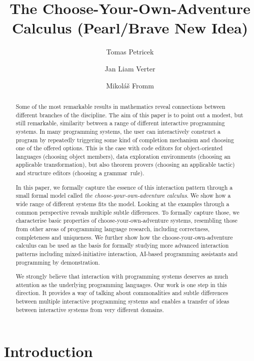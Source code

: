 \documentclass[ a4paper,UKenglish,cleveref, autoref, thm-restate]{lipics-v2021}
\title{The Choose-Your-Own-Adventure Calculus (Pearl/Brave New Idea)}
\author{Tomas Petricek}{Charles University, Prague, Czechia}{tomas@tomasp.net}{0000-0002-7242-2208}{}
\author{Jan Liam Verter}{Charles University, Prague, Czechia}{todo@todo}{}{}
\author{Mikoláš Fromm}{Charles University, Prague, Czechia}{todo@todo}{}{}
\begin{document}
\maketitle

\begin{abstract}
\noindent
Some of the most remarkable results in mathematics reveal connections between different
branches of the discipline. The aim of this paper is to point out a modest, but still
remarkable, similarity between a range of different interactive programming systems.
%
In many programming systems, the user can interactively construct a program by repeatedly
triggering some kind of completion mechanism and choosing one of the offered options. This
is the case with code editors for object-oriented languages (choosing object members), data
exploration environments (choosing an applicable transformation), but also theorem provers
(choosing an applicable tactic) and structure editors (choosing a grammar~rule).

In this paper, we formally capture the essence of this interaction pattern through a small
formal model called \emph{the choose-your-own-adventure calculus}. We show how a wide range
of different systems fits the model. Looking at the examples through a common perspective
reveals multiple subtle differences. To formally capture those, we characterise
basic properties of choose-your-own-adventure systems, resembling those from other areas
of programming language research, including correctness, completeness and uniqueness.
%
We further show how the choose-your-own-adventure calculus can be used as the basis for
formally studying more advanced interaction patterns including mixed-initiative interaction,
AI-based programming assistants and programming by demonstration.

We strongly believe that interaction with programming systems deserves as much attention
as the underlying programming languages. Our work is one step in this direction. It provides
a way of talking about commonalities and subtle differences between multiple interactive
programming systems and enables a transfer of ideas between interactive systems from very
different domains.

\end{abstract}

\newpage

\section{Introduction}
\end{document}

